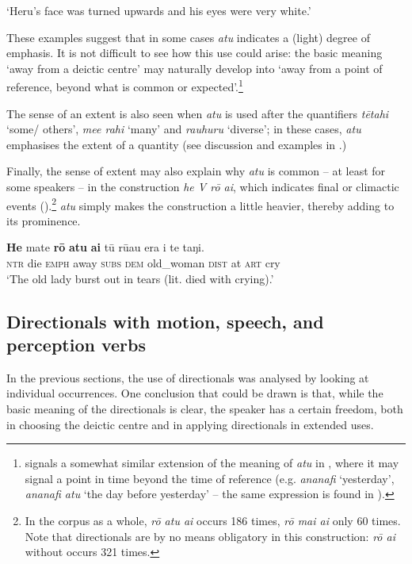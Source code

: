\glt
‘Heru’s face was turned upwards and his eyes were very white.’ \textstyleExampleref{[R313.043]} 
\z

These examples suggest that in some cases \textit{atu} indicates a (light) degree of emphasis. It is not difficult to see how this use could arise: the basic meaning ‘away from a deictic centre’ may naturally develop into ‘away from a point of reference, beyond what is common or expected’.\footnote{\label{fn:358}\citet[291]{Hooper2002} signals a somewhat similar extension of the meaning of \textit{atu} in , where it may signal a point in time beyond the time of reference (e.g. \textit{ananafi} ‘yesterday’, \textit{ananafi atu} ‘the day before yesterday’ – the same expression is found in ).} 

The sense of an extent is also seen when \textit{atu} is used after the quantifiers \textit{\mbox{tētahi}} ‘some/ others’, \textit{me{\ꞌ}e rahi} ‘many’ and \textit{rauhuru} ‘diverse’; in these cases, \textit{atu} emphasises the extent of a quantity (see discussion and examples in .) 

Finally, the sense of extent may also explain why \textit{atu} is common – at least for some speakers – in the construction \textit{he V rō {\ꞌ}ai}, which indicates final or climactic events ().\footnote{\label{fn:359}In the corpus as a whole, \textit{rō atu {\ꞌ}ai} occurs 186 times, \textit{rō mai {\ꞌ}ai} only 60 times. Note that directionals are by no means obligatory in this construction: \textit{rō {\ꞌ}ai} without  occurs 321 times.}  \textit{atu} simply makes the construction a little heavier, thereby adding to its prominence.

\ea\label{ex:7.151}
\gll \textbf{He} mate \textbf{rō} \textbf{atu} \textbf{{\ꞌ}ai} tū rū{\ꞌ}au era {\ꞌ}i te taŋi. \\
\textsc{ntr} die \textsc{emph} away \textsc{subs} \textsc{dem} old\_woman \textsc{dist} at \textsc{art} cry \\

\glt 
‘The old lady burst out in tears (lit. died with crying).’ \textstyleExampleref{[R313.104]} 
\z

\subsection{Directionals with motion, speech, and perception verbs}\label{sec:7.5.2}
In the previous sections, the use of directionals was analysed by looking at individual occurrences. One conclusion that could be drawn is that, while the basic meaning of the directionals is clear, the speaker has a certain freedom, both in choosing the deictic centre and in applying directionals in extended uses. 


